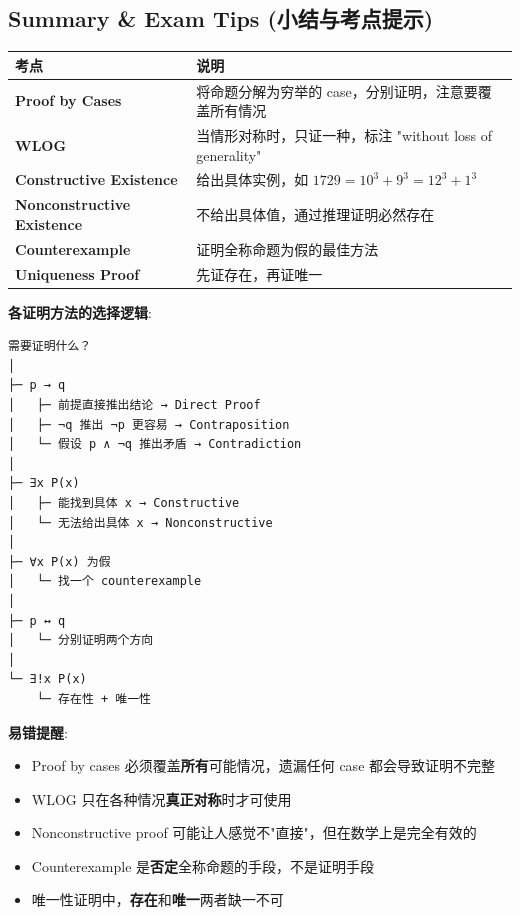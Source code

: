 \documentclass[10pt,a4paper,openany]{ctexbook}
\theoremstyle{definition}
\theoremstyle{remark}
\begin{document}
\vspace{-2pt}

\subsection{Summary \& Exam Tips (小结与考点提示)}

\begin{center}
\begin{tabular}{ll}
\hline
考点 & 说明 \\ \hline
\textbf{Proof by Cases} & 将命题分解为穷举的 case，分别证明，注意要覆盖所有情况 \\
\textbf{WLOG} & 当情形对称时，只证一种，标注 "without loss of generality" \\
\textbf{Constructive Existence} & 给出具体实例，如 $1729 = 10^3 + 9^3 = 12^3 + 1^3$ \\
\textbf{Nonconstructive Existence} & 不给出具体值，通过推理证明必然存在 \\
\textbf{Counterexample} & 证明全称命题为假的最佳方法 \\
\textbf{Uniqueness Proof} & 先证存在，再证唯一 \\
\hline
\end{tabular}

\end{center}

\textbf{各证明方法的选择逻辑}:
{\footnotesize\begin{verbatim}
需要证明什么？
│
├─ p → q
│   ├─ 前提直接推出结论 → Direct Proof
│   ├─ ¬q 推出 ¬p 更容易 → Contraposition
│   └─ 假设 p ∧ ¬q 推出矛盾 → Contradiction
│
├─ ∃x P(x)
│   ├─ 能找到具体 x → Constructive
│   └─ 无法给出具体 x → Nonconstructive
│
├─ ∀x P(x) 为假
│   └─ 找一个 counterexample
│
├─ p ↔ q
│   └─ 分别证明两个方向
│
└─ ∃!x P(x)
    └─ 存在性 + 唯一性
\end{verbatim}}

\textbf{易错提醒}:
\begin{itemize}
\item Proof by cases 必须覆盖\textbf{所有}可能情况，遗漏任何 case 都会导致证明不完整
\item WLOG 只在各种情况\textbf{真正对称}时才可使用
\item Nonconstructive proof 可能让人感觉不"直接"，但在数学上是完全有效的
\item Counterexample 是\textbf{否定}全称命题的手段，不是证明手段
\item 唯一性证明中，\textbf{存在}和\textbf{唯一}两者缺一不可

\end{itemize}
\end{document}
